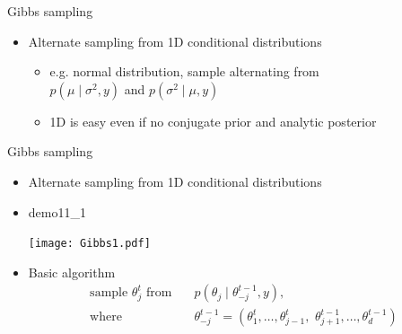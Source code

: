 \documentclass[finnish,english,t]{beamer}
\begin{document}

\begin{frame}{Gibbs sampling}

  \begin{itemize}
  \item Alternate sampling from 1D conditional distributions
    \begin{itemize}
    \item e.g. normal distribution, sample alternating from\\
      $p(\mu \mid \sigma^2, y)$ and $p(\sigma^2 \mid \mu, y)$\\
      \vspace{0.2\baselineskip}
    \item<3-> 1D is easy even if no conjugate prior and analytic posterior
    \end{itemize}
  \end{itemize}
\end{frame}

\begin{frame}{Gibbs sampling}

  \vspace{-\baselineskip}
  \begin{itemize}
  \item Alternate sampling from 1D conditional distributions
  \item demo11\_1\\
    \vspace{-.5\baselineskip}
     \begin{center}
       \texttt{[image: Gibbs1.pdf]}
     \end{center}
    \vspace{-.5\baselineskip}
     \item<2-> Basic algorithm {
      \begin{align*}
         \text{sample $\theta_j^t$ from} \quad & p(\theta_j \mid \theta_{-j}^{t-1}, y),\\
      \text{where} \quad
        & \theta^{t-1}_{-j}= (\theta^t_1,\dots,\theta^t_{j-1},\,\,
        \theta^{t-1}_{j+1},\dots,\theta^{t-1}_d)
      \end{align*}
      }
  \end{itemize}

\end{frame}
\end{document}
